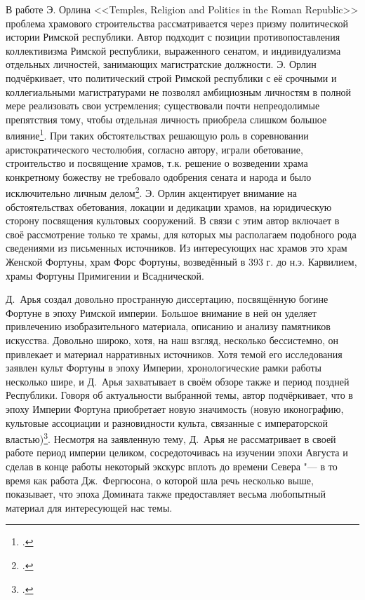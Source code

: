 
В работе Э. Орлина <<Temples, Religion and Politics in the Roman Republic>> проблема храмового строительства рассматривается через призму политической истории Римской республики. Автор подходит с позиции противопоставления коллективизма Римской республики, выраженного сенатом, и индивидуализма отдельных личностей, занимающих магистратские должности. Э. Орлин подчёркивает, что политический строй Римской республики с её срочными и коллегиальными магистратурами не позволял амбициозным личностям в полной мере реализовать свои устремления; существовали почти непреодолимые препятствия тому, чтобы отдельная личность приобрела слишком большое влияние\footcite[P. 2]{Orlin2002}. При таких обстоятельствах решающую роль в соревновании аристократического честолюбия, согласно автору, играли обетование, строительство и посвящение храмов, т.к. решение о возведении храма конкретному божеству не требовало одобрения сената и народа и было исключительно личным делом\footcite[P. 4--5]{Orlin2002}. Э. Орлин акцентирует внимание на обстоятельствах обетования, локации и дедикации храмов, на юридическую сторону посвящения культовых сооружений. В связи с этим автор включает в своё рассмотрение только те храмы, для которых мы располагаем подобного рода сведениями из письменных источников. Из интересующих нас храмов это храм Женской Фортуны, храм Форс Фортуны, возведённый в 393 г. до н.э. Карвилием, храмы Фортуны Примигении и Всаднической.


Д.~Арья создал довольно пространную диссертацию, посвящённую богине Фортуне в эпоху Римской империи. Большое внимание в ней он уделяет привлечению изобразительного материала, описанию и анализу памятников искусства. Довольно широко, хотя, на наш взгляд, несколько бессистемно, он привлекает и материал нарративных источников. Хотя темой его исследования заявлен культ Фортуны в эпоху Империи, хронологические рамки работы несколько шире, и Д.~Арья захватывает в своём обзоре также и период поздней Республики. Говоря об актуальности выбранной темы, автор подчёркивает, что в эпоху Империи Фортуна приобретает новую значимость (новую иконографию, культовые ассоциации и разновидности культа, связанные с императорской властью)\footcite[P. V, VIII--IX]{Arya2002}. Несмотря на заявленную тему, Д.~Арья не рассматривает в своей работе период империи целиком, сосредоточивась на изучении эпохи Августа и сделав в конце работы некоторый экскурс вплоть до времени Севера "--- в то время как работа Дж.~Фергюсона, о которой шла речь несколько выше, показывает, что эпоха Домината также предоставляет весьма любопытный материал для интересующей нас темы.


